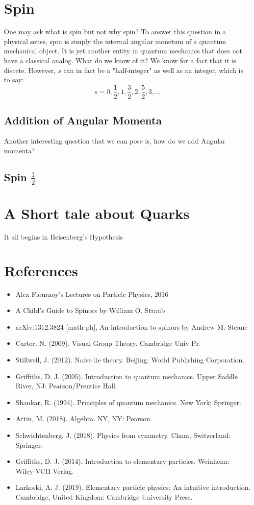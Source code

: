 \documentclass[]{article}
\begin{document}
\section{Spin}
One may ask what is spin but not why spin? To answer this question in a physical sense, spin is simply the internal angular monetum of a quantum mechanical object. It is yet another entity in quantum mechanics that does not have a classical analog. What do we know of it? We know for a fact that it is discete. 
However, $s$ can in fact be a "half-integer" as well as an integer, which is to say:
$$s = 0, \frac{1}{2}, 1, \frac{3}{2}, 2, \frac{5}{2}, 3, ...$$
\subsection{Addition of Angular Momenta}
Another interesting question that we can pose is, how do we add Angular momenta? 
\subsection{Spin $\frac{1}{2}$}

\section{A Short tale about Quarks}
It all begins in Heisenberg's Hypothesis
\section*{References}
\begin{itemize}
\item Alex Flournoy's Lectures on Particle Physics, 2016
\item A Child’s Guide to Spinors by William O. Straub
\item arXiv:1312.3824 [math-ph], An introduction to spinors by Andrew M. Steane 
\item Carter, N. (2009). Visual Group Theory. Cambridge Univ Pr.
\item Stillwell, J. (2012). Naive lie theory. Beijing: World Publishing Corporation.
\item Griffiths, D. J. (2005). Introduction to quantum mechanics. Upper Saddle River, NJ: Pearson/Prentice Hall.
\item Shankar, R. (1994). Principles of quantum mechanics. New York: Springer.
\item Artin, M. (2018). Algebra. NY, NY: Pearson.
\item Schwichtenberg, J. (2018). Physics from symmetry. Cham, Switzerland: Springer.
\item Griffiths, D. J. (2014). Introduction to elementary particles. Weinheim: Wiley-VCH Verlag.
\item Larkoski, A. J. (2019). Elementary particle physics: An intuitive introduction. Cambridge, United Kingdom: Cambridge University Press.
\end{itemize}
\end{document}

